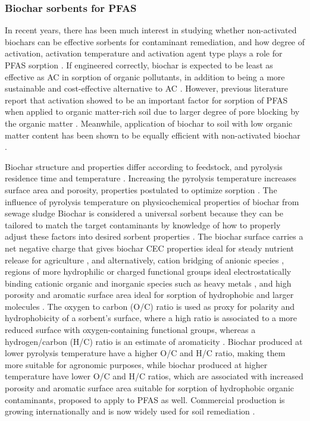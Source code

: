 \subsubsection{Biochar sorbents for PFAS}
In recent years, there has been much interest in studying whether non-activated biochars can be effective sorbents for contaminant remediation, and how degree of activation, activation temperature and activation agent type plays a role for PFAS sorption \citep{Sormo2021}. If engineered correctly, biochar is expected to be least as effective as AC in sorption of organic pollutants, in addition to being a more sustainable and cost-effective alternative to AC \citep{Alhashimi2017, Sormo2021}. However, previous literature report that activation showed to be an important factor for sorption of PFAS when applied to organic matter-rich soil due to larger degree of pore blocking by the organic matter \citep{Sormo2021}. Meanwhile, application of biochar to soil with low organic matter content has been shown to be equally efficient with non-activated biochar \citep{Alhashimi2017}. 

Biochar structure and properties differ according to feedstock, and pyrolysis residence time and temperature \citep{Ahmad2014}. Increasing the pyrolysis temperature increases surface area and porosity, properties postulated to optimize sorption \citep{Ahmad2014}. The influence of pyrolysis temperature on physicochemical properties of biochar from sewage sludge \citep{Figueiredo2018}Biochar is considered a universal sorbent because they can be tailored to match the target contaminants by knowledge of how to properly adjust these factors into desired sorbent properties \citep{Ahmad2014}. The biochar surface carries a net negative charge that gives biochar CEC properties ideal for steady nutrient release for agriculture \citep{das2020application}, and alternatively, cation bridging of anionic species \citep{silvani2019can}, regions of more hydrophilic or charged functional groups ideal electrostatically binding cationic organic and inorganic species such as heavy metals \citep{silvani2019can,zhang2013sorption}, and high porosity and aromatic surface area ideal for sorption of hydrophobic and larger molecules \citep{Cornelissen2005}. The oxygen to carbon (O/C) ratio is used as proxy for polarity and hydrophobicity of a sorbent's surface, where a high ratio is associated to a more reduced surface with oxygen-containing functional groups, whereas a hydrogen/carbon (H/C) ratio is an estimate of aromaticity \citep{Ahmad2014}. Biochar produced at lower pyrolysis temperature have a higher O/C and H/C ratio, making them more suitable for agronomic purposes, while biochar produced at higher temperature have lower O/C and H/C ratios, which are associated with increased porosity and aromatic surface area suitable for sorption of hydrophobic organic contaminants, proposed to apply to PFAS as well. Commercial production is growing internationally and is now widely used for soil remediation \citep{Ahmad2014}.


